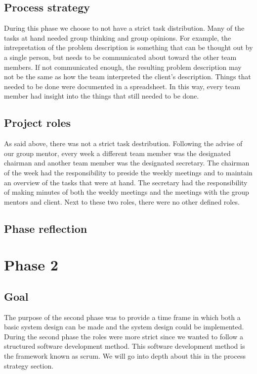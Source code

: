 \subsection{Process strategy}
During this phase we choose to not have a strict task distribution.
Many of the tasks at hand needed group thinking and group opinions.
For example, the intrepretation of the problem description is something that can be thought out by a single person, but needs to be communicated about toward the other team members.
If not communicated enough, the resulting problem description may not be the same as how the team interpreted the client's description.
Things that needed to be done were documented in a spreadsheet.
In this way, every team member had insight into the things that still needed to be done.

\subsection{Project roles}
As said above, there was not a strict task destribution.
Following the advise of our group mentor, every week a different team member was the designated chairman and another team member was the designated secretary.
The chairman of the week had the responsibility to preside the weekly meetings and to maintain an overview of the tasks that were at hand.
The secretary had the responsibility of making minutes of both the weekly meetings and the meetings with the group mentors and client.
Next to these two roles, there were no other defined roles.

\subsection{Phase reflection}

\section{Phase 2}
\subsection{Goal}
The purpose of the second phase was to provide a time frame in which both a basic system design can be made and the system design could be implemented.
During the second phase the roles were more strict since we wanted to follow a structured software development method.
This software development method is the framework known as scrum.
We will go into depth about this in the process strategy section.

